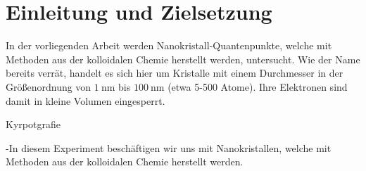 \section{Einleitung und Zielsetzung}
\label{sec:Ziel}
In der vorliegenden Arbeit werden Nanokristall-Quantenpunkte, welche mit Methoden
aus der kolloidalen Chemie herstellt werden, untersucht. Wie der Name bereits
verrät, handelt es sich hier um Kristalle mit einem Durchmesser in der
Größenordnung von $\SI{1}{\nano\meter}$ bis $\SI{100}{\nano\meter}$ (etwa 5-500 Atome).
Ihre Elektronen sind damit in kleine Volumen eingesperrt. 

Kyrpotgrafie

-In diesem Experiment beschäftigen wir uns mit Nanokristallen, welche mit Methoden
aus der kolloidalen Chemie herstellt werden.
